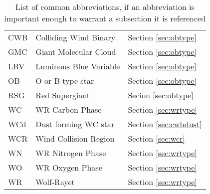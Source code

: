\begin{abbreviations}

\begin{table}[h]
  \centering
  \begin{tabular}{l|l|l}
    
    \hline

    CWB & Colliding Wind Binary  & Section \ref{sec:obtype} \\
    GMC & Giant Molecular Cloud & Section \ref{sec:obtype}\\
    LBV & Luminous Blue Variable & Section \ref{sec:obtype} \\
    OB  & O or B type star & Section \ref{sec:obtype} \\ 
    RSG & Red Supergiant & Secion \ref{sec:obtype} \\
    WC  & WR Carbon Phase & Section \ref{sec:wrtype} \\
    WCd & Dust forming WC star & Section \ref{sec:cwbdust} \\
    WCR & Wind Collision Region & Section \ref{sec:wcr} \\
    WN  & WR Nitrogen Phase & Section \ref{sec:wrtype} \\
    WO  & WR Oxygen Phase & Section \ref{sec:wrtype} \\
    WR  & Wolf-Rayet & Section \ref{sec:wrtype} \\

    \hline

  \end{tabular} 
  \label{tbl:Abbreviations}
  \caption{List of common abbreviations, if an abbreviation is important enough to warrant a subsection it is referenced}
  \end{table}

\end{abbreviations}
